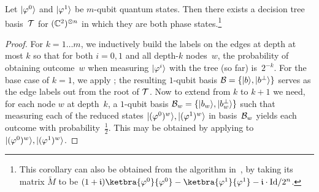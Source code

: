 \begin{corollary} \label{cor:perpy}
     Let $\lvert\varphi^0\rangle$ and $\lvert\varphi^1\rangle$ be $m$-qubit quantum states. Then there exists a decision tree basis~$\mathcal{T}$ for $(\mathbb{C}^2)^{\otimes n}$ in which they are both phase states.\footnote{This corollary can also be obtained from the algorithm in~\cite[Sec.~III]{zhou2020saturating}, by taking its matrix $\tilde{M}$ to be $(1+\mathfrak{i})\ketbra{\phi^0}{\phi^0} - \ketbra{\phi^1}{\phi^1} - \mathfrak{i} \cdot \Id/2^n$.}
\end{corollary}
\begin{proof}
    For $k = 1 \dots m$, we inductively build the labels on the edges at depth at most $k$ so that for both $i = 0, 1$ and all depth-$k$ nodes~$w$, the probability of obtaining outcome~$w$ when measuring $\lvert\varphi^i\rangle$ with the tree (so far) is~$2^{-k}$.
    For the base case of $k = 1$, we apply ; the resulting $1$-qubit basis $\mathcal{B} = \{\lvert b\rangle, \lvert\smash{b^\bot}\rangle\}$ serves as the edge labels out from the root of $\mathcal{T}$.
    Now to extend from $k$ to $k+1$ we need, for each node $w$ at depth~$k$, a $1$-qubit basis $\mathcal{B}_w = \{\lvert b_w\rangle, \lvert b_w^\bot\rangle\}$ such that measuring each of the reduced states $\lvert(\varphi^0)^{w}\rangle, \lvert(\varphi^1)^{w}\rangle$ in basis~$\mathcal{B}_w$ yields each outcome with probability~$\frac12$. This may be obtained by applying  to $\lvert(\varphi^0)^{w}\rangle, \lvert(\varphi^1)^{w}\rangle$.


\end{proof}
